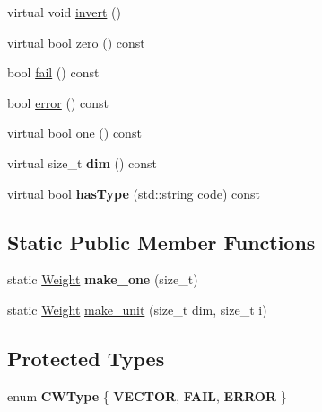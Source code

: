 \begin{DoxyCompactItemize}
virtual void \mbox{\hyperlink{classCountingWeight_ab9749abc9fbcee9ed064a9be33879829}{invert}} ()
\item 
virtual bool \mbox{\hyperlink{group__weight_ga62b599ef59770e981d17d565e6727ca9}{zero}} () const
\item 
bool \mbox{\hyperlink{classCountingWeight_a4b5b3fa15f85d10d35f062225b35323d}{fail}} () const
\item 
bool \mbox{\hyperlink{group__weight_ga41f35b8902b2474f1ac39878a40f5ca5}{error}} () const
\item 
virtual bool \mbox{\hyperlink{group__weight_ga5189380be1ac03126180846e3a8fd1cb}{one}} () const
\item 
\mbox{\label{classCountingWeight_a1b0bd542683b909c2dc4d35bbbf42887}} 
virtual size\+\_\+t {\bfseries dim} () const
\item 
\mbox{\label{classCountingWeight_aedc7b4e3519adc6e29bcabd4d8ba719a}} 
virtual bool {\bfseries has\+Type} (std\+::string code) const
\end{DoxyCompactItemize}
\subsection*{Static Public Member Functions}
\begin{DoxyCompactItemize}
\item 
static \mbox{\hyperlink{classWeight}{Weight}} {\bfseries make\+\_\+one} (size\+\_\+t)
\item 
static \mbox{\hyperlink{classWeight}{Weight}} \mbox{\hyperlink{group__weight_ga12cda7b4188f3917d256808fd42c3364}{make\+\_\+unit}} (size\+\_\+t dim, size\+\_\+t i)
\end{DoxyCompactItemize}
\subsection*{Protected Types}
\begin{DoxyCompactItemize}
\item 
\mbox{\label{classCountingWeight_a55bf303a40883d4a5c8be74b6d10b928}} 
enum {\bfseries C\+W\+Type} \{ {\bfseries V\+E\+C\+T\+OR}, 
{\bfseries F\+A\+IL}, 
{\bfseries E\+R\+R\+OR}
 \}
\end{DoxyCompactItemize}
